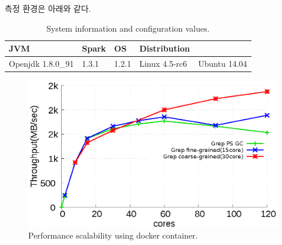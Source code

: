 \documentclass{kcc}
\begin{document}
측정 환경은 아래와 같다.

\begin{table}[h!]
  \centering
  \small
  \begin{tabular}{l l l l l} \toprule
    JVM & Spark & OS & Distribution\\
    \midrule
    Openjdk 1.8.0\_91 & 1.3.1 & 1.2.1 & Linux 4.5-rc6 & Ubuntu 14.04\\ 
    \bottomrule
  \end{tabular}
  \caption{System information and configuration values.}
  \label{tab:memuse}
\end{table}

\begin{figure}[tb!]
    \centering
    \includegraphics[width=4.8in]{graph/scalability.eps}
    \caption{Performance scalability using docker container.}
    \label{fig:docker}
\end{figure}
\end{document}
